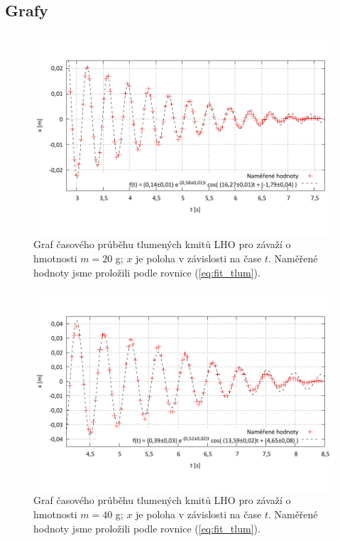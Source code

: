 \documentclass[english]{article}
\begin{document}
\newpage
\subsection{Grafy}

	\begin{figure}[h]
	\begin{center}
	    \vspace*{-1cm}
		\includegraphics[width=\linewidth]{../gnuplot/10_lho_tlum_20g_2.pdf}
	    \vspace*{-2cm}
			\caption{Graf časového průběhu tlumených kmitů LHO pro závaží o hmotnosti $m=20$ g; $x$ je poloha v závislosti na čase $t$. Naměřené hodnoty jsme proložili podle rovnice (\ref{eq:fit_tlum}).}
			\label{fig:lho_tlum_20g}
	\end{center}
	\end{figure}
	
	\begin{figure}[h!]
	\begin{center}
		\vspace*{-1cm}
		\includegraphics[width=\linewidth]{../gnuplot/10_lho_tlum_40g_2.pdf}
		\vspace*{-2cm}    
		\caption{Graf časového průběhu tlumených kmitů LHO pro závaží o hmotnosti $m=40$ g; $x$ je poloha v závislosti na čase $t$. Naměřené hodnoty jsme proložili podle rovnice (\ref{eq:fit_tlum}).}
		\label{fig:lho_tlum_40g}
	\end{center}
	\end{figure}
	
\end{document}
